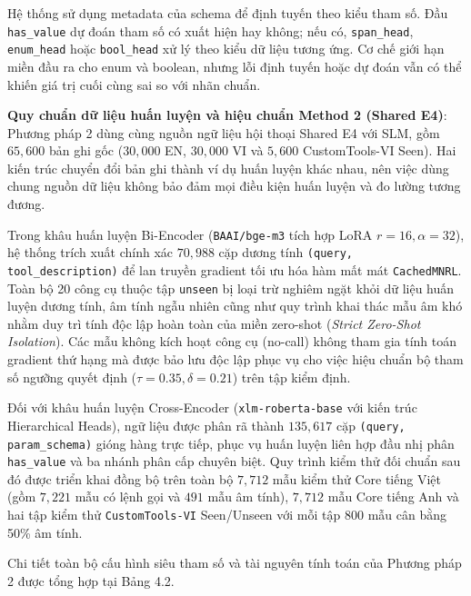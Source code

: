 Hệ thống sử dụng metadata của schema để định tuyến theo kiểu tham số. Đầu \texttt{has_value} dự đoán tham số có xuất hiện hay không; nếu có, \texttt{span_head}, \texttt{enum_head} hoặc \texttt{bool_head} xử lý theo kiểu dữ liệu tương ứng. Cơ chế giới hạn miền đầu ra cho enum và boolean, nhưng lỗi định tuyến hoặc dự đoán vẫn có thể khiến giá trị cuối cùng sai so với nhãn chuẩn.

\textbf{Quy chuẩn dữ liệu huấn luyện và hiệu chuẩn Method 2 (Shared E4)}:
Phương pháp 2 dùng cùng nguồn ngữ liệu hội thoại Shared E4 với SLM, gồm $65{,}600$ bản ghi gốc ($30{,}000$ EN, $30{,}000$ VI và $5{,}600$ CustomTools-VI Seen). Hai kiến trúc chuyển đổi bản ghi thành ví dụ huấn luyện khác nhau, nên việc dùng chung nguồn dữ liệu không bảo đảm mọi điều kiện huấn luyện và đo lường tương đương.

Trong khâu huấn luyện Bi-Encoder (\texttt{BAAI/bge-m3} tích hợp LoRA $r=16, \alpha=32$), hệ thống trích xuất chính xác $70{,}988$ cặp dương tính \texttt{(query, tool_description)} để lan truyền gradient tối ưu hóa hàm mất mát \texttt{CachedMNRL}. Toàn bộ 20 công cụ thuộc tập \texttt{unseen} bị loại trừ nghiêm ngặt khỏi dữ liệu huấn luyện dương tính, âm tính ngẫu nhiên cũng như quy trình khai thác mẫu âm khó nhằm duy trì tính độc lập hoàn toàn của miền zero-shot (\textit{Strict Zero-Shot Isolation}). Các mẫu không kích hoạt công cụ (no-call) không tham gia tính toán gradient thứ hạng mà được bảo lưu độc lập phục vụ cho việc hiệu chuẩn bộ tham số ngưỡng quyết định ($\tau = 0.35, \delta = 0.21$) trên tập kiểm định.

Đối với khâu huấn luyện Cross-Encoder (\texttt{xlm-roberta-base} với kiến trúc Hierarchical Heads), ngữ liệu được phân rã thành $135{,}617$ cặp \texttt{(query, param_schema)} gióng hàng trực tiếp, phục vụ huấn luyện liên hợp đầu nhị phân \texttt{has_value} và ba nhánh phân cấp chuyên biệt. Quy trình kiểm thử đối chuẩn sau đó được triển khai đồng bộ trên toàn bộ $7{,}712$ mẫu kiểm thử Core tiếng Việt (gồm $7{,}221$ mẫu có lệnh gọi và $491$ mẫu âm tính), $7{,}712$ mẫu Core tiếng Anh và hai tập kiểm thử \texttt{CustomTools-VI} Seen/Unseen với mỗi tập $800$ mẫu cân bằng 50\% âm tính.

Chi tiết toàn bộ cấu hình siêu tham số và tài nguyên tính toán của Phương pháp 2 được tổng hợp tại Bảng 4.2.


